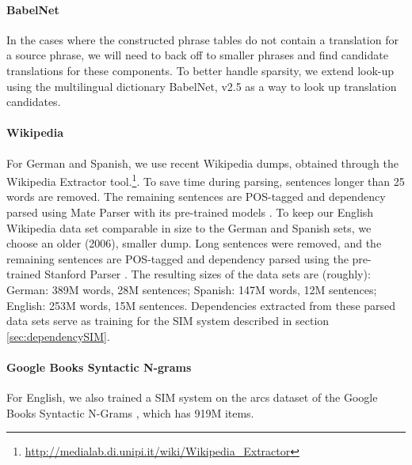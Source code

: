 \documentclass[11pt]{article}
\begin{document}
\paragraph{BabelNet} %

In the cases where the constructed phrase tables do not contain a translation for a source phrase, we will need to back off to smaller phrases and find candidate translations for these components.  To better handle sparsity, we extend look-up using the multilingual dictionary BabelNet, v2.5 \cite{Navigli:Ponzetto:12} as a way to look up translation candidates.

\paragraph{Wikipedia} %


For German and Spanish, we use recent Wikipedia dumps, obtained through the Wikipedia Extractor tool.\footnote{\url{http://medialab.di.unipi.it/wiki/Wikipedia_Extractor}}. To save time during parsing, sentences longer than 25 words are removed. The remaining sentences are POS-tagged and dependency parsed using Mate Parser with its pre-trained models \cite{bohnet:10,bohnet:kuhn:12,seeker:kuhn:13}. To keep our English Wikipedia data set comparable in size to the German and Spanish sets, we choose an older (2006), smaller dump. Long sentences were removed, and the remaining sentences are POS-tagged and dependency parsed using the pre-trained Stanford Parser \cite{klein:manning:03,marneffe:maccartney:ea:06}. The resulting sizes of the data sets are (roughly): German: 389M words, 28M sentences; Spanish: 147M words, 12M sentences; English: 253M words, 15M sentences. Dependencies extracted from these parsed data sets serve as training for the SIM system described in section \ref{sec:dependencySIM}.

\paragraph{Google Books Syntactic N-grams}
For English, we also trained a SIM system on the arcs dataset of the Google Books Syntactic N-Grams \cite{goldberg:orwant:13}, which has 919M items.%
\end{document}
